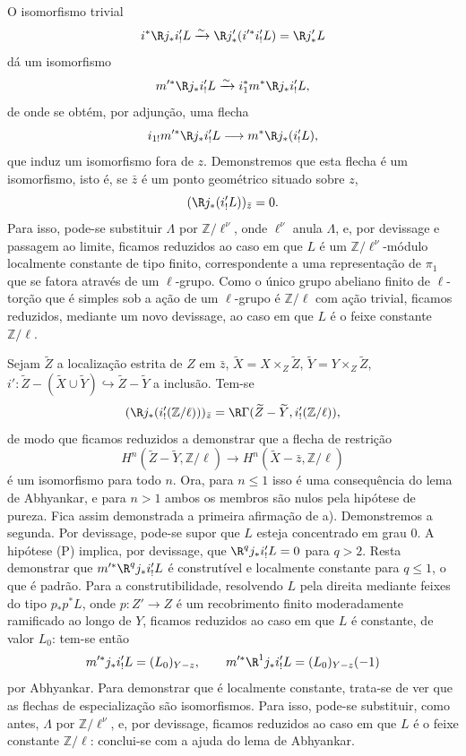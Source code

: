 O isomorfismo trivial
\[
i^*\R j_*i'_!L\xrightarrow{\sim}\R j'_*(i'^*i'_!L)=\R j'_*L
\]
dá um isomorfismo
\[
m'^*\R j_*i'_!L\xrightarrow{\sim} i_1^*m^*\R j_*i'_!L,
\]
de onde se obtém, por adjunção, uma flecha
\[
i_{1!}m'^*\R j_*i'_!L\longrightarrow m^*\R j_*(i'_!L),
\]
que induz um isomorfismo fora de $z$. Demonstremos que esta flecha é um isomorfismo, isto é, se $\bar z$ é um ponto geométrico situado sobre $z$,
\[
(\R j_*(i'_!L))_{\bar z}=0.
\]
Para isso, pode-se substituir $\Lambda$ por $\mathbb Z/\ell^\nu$, onde $\ell^\nu$ anula $\Lambda$, e, por devissage e passagem ao limite, ficamos reduzidos ao caso em que $L$ é um $\mathbb Z/\ell^\nu$-módulo localmente constante de tipo finito, correspondente a uma representação de $\pi_1$ que se fatora através de um $\ell$-grupo. Como o único grupo abeliano finito de $\ell$-torção que é simples sob a ação de um $\ell$-grupo é $\mathbb Z/\ell$ com ação trivial, ficamos reduzidos, mediante um novo devissage, ao caso em que $L$ é o feixe constante $\mathbb Z/\ell$.

Sejam $\widetilde Z$ a localização estrita de $Z$ em $\bar z$, $\widetilde X=X\times_Z\widetilde Z$, $\widetilde Y=Y\times_Z\widetilde Z$, $i':\widetilde Z-(\widetilde X\cup\widetilde Y)\hookrightarrow \widetilde Z-\widetilde Y$ a inclusão. Tem-se
\[
(\R j_*(i'_!(\mathbb Z/\ell)))_{\bar z}
=\R\Gamma(\widetilde Z-\widetilde Y,i'_!(\mathbb Z/\ell)),
\]
de modo que ficamos reduzidos a demonstrar que a flecha de restrição
\[
H^n(\widetilde Z-\widetilde Y,\mathbb Z/\ell)
\longrightarrow
H^n(\widetilde X-\bar z,\mathbb Z/\ell)
\]
é um isomorfismo para todo $n$. Ora, para $n\le1$ isso é uma consequência do lema de Abhyankar, e para $n>1$ ambos os membros são nulos pela hipótese de pureza. Fica assim demonstrada a primeira afirmação de a). Demonstremos a segunda. Por devissage, pode-se supor que $L$ esteja concentrado em grau $0$. A hipótese (P) implica, por devissage, que $\R^qj_*i'_!L=0$ para $q>2$. Resta demonstrar que $m'^*\R^qj_*i'_!L$ é construtível e localmente constante para $q\le1$, o que é padrão. Para a construtibilidade, resolvendo $L$ pela direita mediante feixes do tipo $p_*p^*L$, onde $p:Z'\to Z$ é um recobrimento finito moderadamente ramificado ao longo de $Y$, ficamos reduzidos ao caso em que $L$ é constante, de valor $L_0$: tem-se então
\[
m'^*j_*i'_!L=(L_0)_{Y-z},
\qquad
m'^*\R^1j_*i'_!L=(L_0)_{Y-z}(-1)
\]
por Abhyankar. Para demonstrar que é localmente constante, trata-se de ver que as flechas de especialização são isomorfismos. Para isso, pode-se substituir, como antes, $\Lambda$ por $\mathbb Z/\ell^\nu$, e, por devissage, ficamos reduzidos ao caso em que $L$ é o feixe constante $\mathbb Z/\ell$: conclui-se com a ajuda do lema de Abhyankar.
